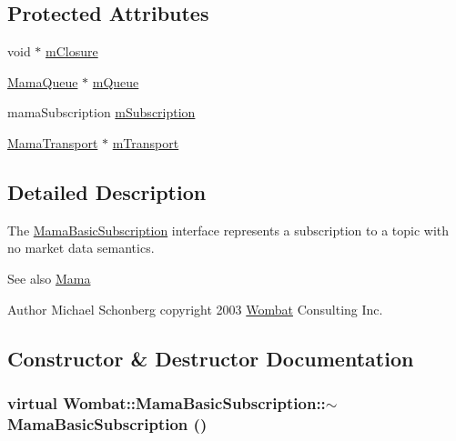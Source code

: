 \subsection*{Protected Attributes}
\begin{DoxyCompactItemize}
\item 
void $\ast$ \hyperlink{classWombat_1_1MamaBasicSubscription_ae25dd14ae861cebee1d4bed6aa618858}{mClosure}
\item 
\hyperlink{classWombat_1_1MamaQueue}{MamaQueue} $\ast$ \hyperlink{classWombat_1_1MamaBasicSubscription_a4509331bc7580c4b3f70ad389793259e}{mQueue}
\item 
mamaSubscription \hyperlink{classWombat_1_1MamaBasicSubscription_a8e3c180ade481768be2dbc93a352671d}{mSubscription}
\item 
\hyperlink{classWombat_1_1MamaTransport}{MamaTransport} $\ast$ \hyperlink{classWombat_1_1MamaBasicSubscription_add3a06fce34e93852a57ef777253794d}{mTransport}
\end{DoxyCompactItemize}


\subsection{Detailed Description}
The {\ttfamily \hyperlink{classWombat_1_1MamaBasicSubscription}{MamaBasicSubscription}} interface represents a subscription to a topic with no market data semantics. \begin{DoxySeeAlso}{See also}
\hyperlink{classWombat_1_1Mama}{Mama} 
\end{DoxySeeAlso}
\begin{DoxyAuthor}{Author}
Michael Schonberg copyright 2003 \hyperlink{namespaceWombat}{Wombat} Consulting Inc. 
\end{DoxyAuthor}


\subsection{Constructor \& Destructor Documentation}
\hypertarget{classWombat_1_1MamaBasicSubscription_a24ad7f3b3dac4e61a0f31b0db364a5e9}{
\subsubsection[{$\sim$MamaBasicSubscription}]{\setlength{\rightskip}{0pt plus 5cm}virtual Wombat::MamaBasicSubscription::$\sim$MamaBasicSubscription ()}}
\label{classWombat_1_1MamaBasicSubscription_a24ad7f3b3dac4e61a0f31b0db364a5e9}


